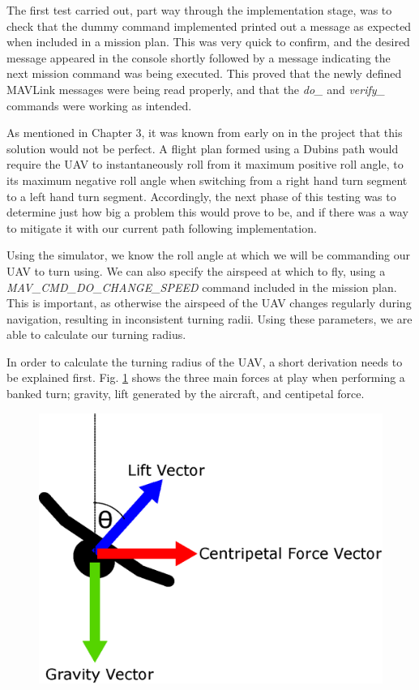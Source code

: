The first test carried out, part way through the implementation stage, was to check that the dummy command implemented printed out a message as expected when included in a mission plan. This was very quick to confirm, and the desired message appeared in the console shortly followed by a message indicating the next mission command was being executed. This proved that the newly defined MAVLink messages were being read properly, and that the \textit{do\_} and \textit{verify\_} commands were working as intended.

As mentioned in Chapter 3, it was known from early on in the project that this solution would not be perfect. A flight plan formed using a Dubins path would require the UAV to instantaneously roll from it maximum positive roll angle, to its maximum negative roll angle when switching from a right hand turn segment to a left hand turn segment. Accordingly, the next phase of this testing was to determine just how big a problem this would prove to be, and if there was a way to mitigate it with our current path following implementation. 

Using the simulator, we know the roll angle at which we will be commanding our UAV to turn using. We can also specify the airspeed at which to fly, using a \textit{MAV\_CMD\_DO\_CHANGE\_SPEED} command included in the mission plan. This is important, as otherwise the airspeed of the UAV changes regularly during navigation, resulting in inconsistent turning radii. Using these parameters, we are able to calculate our turning radius.


In order to calculate the turning radius of the UAV, a short derivation needs to be explained first. Fig. \ref{fig:bankedTurns} shows the three main forces at play when performing a banked turn; gravity, lift generated by the aircraft, and centipetal force. %

\begin{figure}[htbp!] 
\centering    
\includegraphics[height=0.4\textheight]{BankedTurns}
\caption[]{}%
\label{fig:bankedTurns}
\end{figure}

